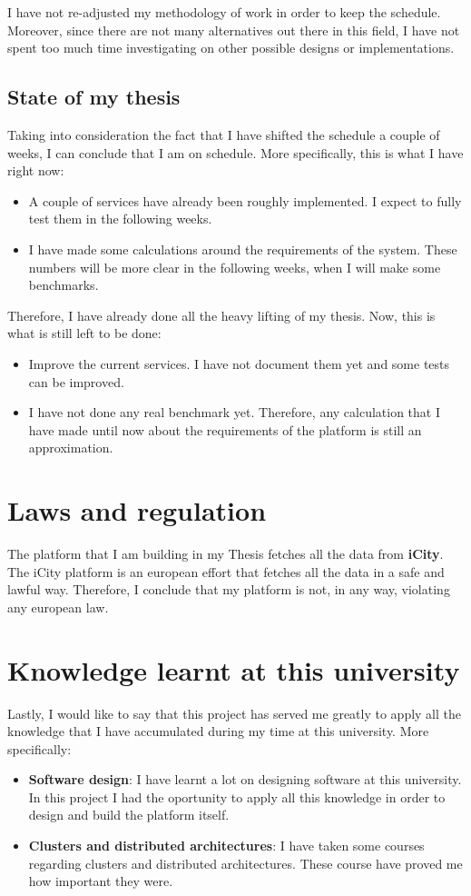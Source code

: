 \documentclass[a4paper,12pt]{article}
\newcommand{\mylist}{
\begin{itemize}
\setlength{\itemsep}{1pt}
\setlength{\parskip}{0pt}
\setlength{\parsep}{0pt}}
\newcommand{\mylistend}{\end{itemize}}
\begin{document}
I have not re-adjusted my methodology of work in order to keep the schedule.
Moreover, since there are not many alternatives out there in this field, I
have not spent too much time investigating on other possible designs or
implementations.

\subsection{State of my thesis}

Taking into consideration the fact that I have shifted the schedule a couple of
weeks, I can conclude that I am on schedule. More specifically, this is what I
have right now:

\mylist
  \item A couple of services have already been roughly implemented. I expect to
fully test them in the following weeks.
  \item I have made some calculations around the requirements of the system.
These numbers will be more clear in the following weeks, when I will make some
benchmarks.
\mylistend

Therefore, I have already done all the heavy lifting of my thesis. Now, this is
what is still left to be done:

\mylist
  \item Improve the current services. I have not document them yet and some
tests can be improved.
  \item I have not done any real benchmark yet. Therefore, any calculation
that I have made until now about the requirements of the platform is still an
approximation.
\mylistend

\section{Laws and regulation}

The platform that I am building in my Thesis fetches all the data from {\bf
iCity}. The iCity platform is an european effort that fetches all the data in a
safe and lawful way. Therefore, I conclude that my platform is not, in any way,
violating any european law.

\section{Knowledge learnt at this university}

Lastly, I would like to say that this project has served me greatly to apply
all the knowledge that I have accumulated during my time at this university.
More specifically:

\mylist
  \item {\bf Software design}: I have learnt a lot on designing software at this
university. In this project I had the oportunity to apply all this knowledge in
order to design and build the platform itself.
  \item {\bf Clusters and distributed architectures}: I have taken some courses
regarding clusters and distributed architectures. These course have proved me
how important they were.
\mylistend
\end{document}
